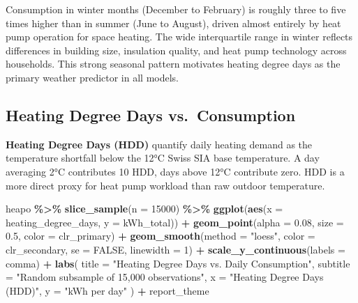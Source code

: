 \documentclass[
]{article}
\newenvironment{Shaded}{\begin{snugshade}}{\end{snugshade}}
\newcommand{\AttributeTok}[1]{\textcolor[rgb]{0.13,0.29,0.53}{#1}}
\newcommand{\ConstantTok}[1]{\textcolor[rgb]{0.56,0.35,0.01}{#1}}
\newcommand{\DecValTok}[1]{\textcolor[rgb]{0.00,0.00,0.81}{#1}}
\newcommand{\FloatTok}[1]{\textcolor[rgb]{0.00,0.00,0.81}{#1}}
\newcommand{\FunctionTok}[1]{\textcolor[rgb]{0.13,0.29,0.53}{\textbf{#1}}}
\newcommand{\NormalTok}[1]{#1}
\newcommand{\SpecialCharTok}[1]{\textcolor[rgb]{0.81,0.36,0.00}{\textbf{#1}}}
\newcommand{\StringTok}[1]{\textcolor[rgb]{0.31,0.60,0.02}{#1}}
\begin{document}
Consumption in winter months (December to February) is roughly three to
five times higher than in summer (June to August), driven almost
entirely by heat pump operation for space heating. The wide
interquartile range in winter reflects differences in building size,
insulation quality, and heat pump technology across households. This
strong seasonal pattern motivates heating degree days as the primary
weather predictor in all models.

\subsection{Heating Degree Days
vs.~Consumption}\label{heating-degree-days-vs.-consumption}

\textbf{Heating Degree Days (HDD)} quantify daily heating demand as the
temperature shortfall below the 12°C Swiss SIA base temperature. A day
averaging 2°C contributes 10 HDD, days above 12°C contribute zero. HDD
is a more direct proxy for heat pump workload than raw outdoor
temperature.

\begin{Shaded}
\begin{Highlighting}[]
\NormalTok{heapo }\SpecialCharTok{\%\textgreater{}\%}
  \FunctionTok{slice\_sample}\NormalTok{(}\AttributeTok{n =} \DecValTok{15000}\NormalTok{) }\SpecialCharTok{\%\textgreater{}\%}
  \FunctionTok{ggplot}\NormalTok{(}\FunctionTok{aes}\NormalTok{(}\AttributeTok{x =}\NormalTok{ heating\_degree\_days, }\AttributeTok{y =}\NormalTok{ kWh\_total)) }\SpecialCharTok{+}
  \FunctionTok{geom\_point}\NormalTok{(}\AttributeTok{alpha =} \FloatTok{0.08}\NormalTok{, }\AttributeTok{size =} \FloatTok{0.5}\NormalTok{, }\AttributeTok{color =}\NormalTok{ clr\_primary) }\SpecialCharTok{+}
  \FunctionTok{geom\_smooth}\NormalTok{(}\AttributeTok{method =} \StringTok{"loess"}\NormalTok{, }\AttributeTok{color =}\NormalTok{ clr\_secondary, }\AttributeTok{se =} \ConstantTok{FALSE}\NormalTok{, }\AttributeTok{linewidth =} \DecValTok{1}\NormalTok{) }\SpecialCharTok{+}
  \FunctionTok{scale\_y\_continuous}\NormalTok{(}\AttributeTok{labels =}\NormalTok{ comma) }\SpecialCharTok{+}
  \FunctionTok{labs}\NormalTok{(}
    \AttributeTok{title =} \StringTok{"Heating Degree Days vs. Daily Consumption"}\NormalTok{,}
    \AttributeTok{subtitle =} \StringTok{"Random subsample of 15,000 observations"}\NormalTok{,}
    \AttributeTok{x =} \StringTok{"Heating Degree Days (HDD)"}\NormalTok{,}
    \AttributeTok{y =} \StringTok{"kWh per day"}
\NormalTok{  ) }\SpecialCharTok{+}
\NormalTok{  report\_theme}
\end{Highlighting}
\end{Shaded}
\end{document}
